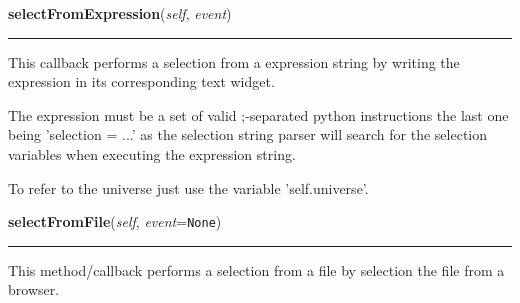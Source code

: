 \hspace{.8\funcindent}\begin{boxedminipage}{\funcwidth}

    \raggedright \textbf{selectFromExpression}(\textit{self}, \textit{event})

    \vspace{-1.5ex}

    \rule{\textwidth}{0.5\fboxrule}
\setlength{\parskip}{2ex}
    This callback performs a selection from a expression string by writing 
    the expression in its corresponding text widget.

    The expression must be a set of valid ;-separated python instructions 
    the last one being 'selection = ...' as the selection string parser 
    will search for the selection variables when executing the expression 
    string.

    To refer to the universe just use the variable 'self.universe'.

\setlength{\parskip}{1ex}
    \end{boxedminipage}

    \label{nMOLDYN:GUI:SelectionDialog:SelectionDialog:selectFromFile}

    \vspace{0.5ex}

\hspace{.8\funcindent}\begin{boxedminipage}{\funcwidth}

    \raggedright \textbf{selectFromFile}(\textit{self}, \textit{event}={\tt None})

    \vspace{-1.5ex}

    \rule{\textwidth}{0.5\fboxrule}
\setlength{\parskip}{2ex}
    This method/callback performs a selection from a file by selection the 
    file from a browser.

\setlength{\parskip}{1ex}
    \end{boxedminipage}

    \label{nMOLDYN:GUI:SelectionDialog:SelectionDialog:selectPrefixName}

